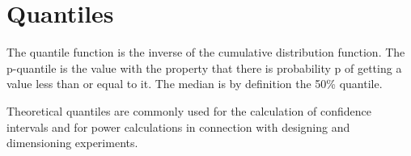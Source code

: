 \documentclass{beamer}
\begin{document}
\section{Quantiles}
\begin{frame}
 The quantile function is the inverse of the cumulative
distribution function. The p-quantile is the value with the
property that there is probability p of getting a value less than
or equal to it. The median is by definition the 50\% quantile.

Theoretical quantiles are commonly used for the calculation of
confidence intervals and for power calculations in connection with
designing and dimensioning experiments.
\end{frame}
\end{document}
